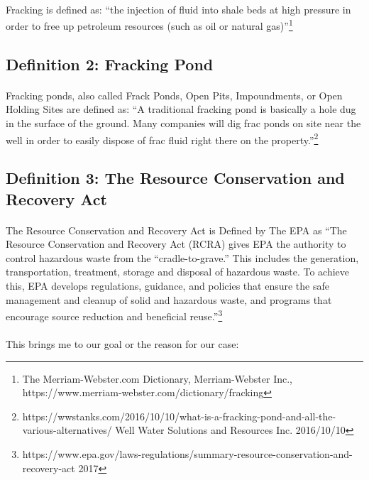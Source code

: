 \documentclass[11pt]{article}
\begin{document}
	\paragraph{}
	Fracking is defined as: ``the injection of fluid into shale beds at high pressure in order to free up petroleum resources (such as oil or natural gas)''\footnote{The Merriam-Webster.com Dictionary, Merriam-Webster Inc., https://www.merriam-webster.com/dictionary/fracking}

	\subsection{Definition 2: Fracking Pond}
	\paragraph{}
	Fracking ponds, also called Frack Ponds, Open Pits, Impoundments, or Open Holding Sites are defined as: ``A traditional fracking pond is basically a hole dug in the surface of the ground. Many companies will dig frac ponds on site near the well in order to easily dispose of frac fluid right there on the property.''\footnote{https://wwstanks.com/2016/10/10/what-is-a-fracking-pond-and-all-the-various-alternatives/ Well Water Solutions and Resources Inc. 2016/10/10}

	\subsection{Definition 3: The Resource Conservation and Recovery Act}
	\paragraph{}
	The Resource Conservation and Recovery Act is Defined by The EPA as ``The Resource Conservation and Recovery Act (RCRA) gives EPA the authority to control hazardous waste from the ``cradle-to-grave.'' This includes the generation, transportation, treatment, storage and disposal of hazardous waste. To achieve this, EPA develops regulations, guidance, and policies that ensure the safe management and cleanup of solid and hazardous waste, and programs that encourage source reduction and beneficial reuse.''\footnote{https://www.epa.gov/laws-regulations/summary-resource-conservation-and-recovery-act 2017}\vspace{1.5em}
	
	\pagebreak
	
	\paragraph{}
	\large
	This brings me to our goal or the reason for our case:
\end{document}
